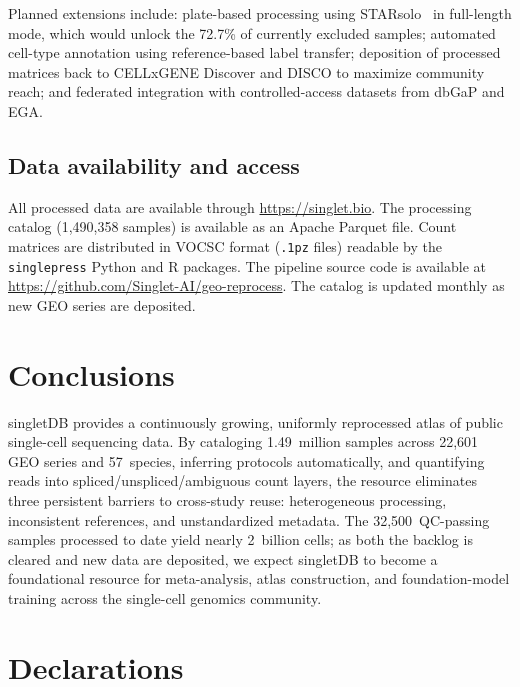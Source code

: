 \documentclass[10pt,twocolumn,letterpaper]{article}
\begin{document}
Planned extensions include: plate-based processing using
STARsolo~\citep{kaminow2021starsolo} in full-length mode, which would
unlock the 72.7\% of currently excluded samples; automated cell-type
annotation using reference-based label transfer; deposition of processed
matrices back to CELLxGENE Discover and DISCO to maximize community
reach; and federated integration with controlled-access datasets from
dbGaP and EGA.

\subsection{Data availability and access}

All processed data are available through \url{https://singlet.bio}.
The processing catalog (1,490,358 samples) is available as an Apache
Parquet file. Count matrices are distributed in VOCSC format
(\texttt{.1pz} files) readable by the \texttt{singlepress} Python
and R packages. The pipeline source code is available at
\url{https://github.com/Singlet-AI/geo-reprocess}. The catalog is
updated monthly as new GEO series are deposited.

\section{Conclusions}

singletDB provides a continuously growing, uniformly reprocessed atlas of
public single-cell sequencing data. By cataloging 1.49~million samples
across 22,601 GEO series and 57~species, inferring protocols
automatically, and quantifying reads into spliced/unspliced/ambiguous
count layers, the resource eliminates three persistent barriers to
cross-study reuse: heterogeneous processing, inconsistent references, and
unstandardized metadata. The 32,500~QC-passing samples processed to date
yield nearly 2~billion cells; as both the backlog is cleared and new data
are deposited, we expect singletDB to become a foundational resource for
meta-analysis, atlas construction, and foundation-model training across
the single-cell genomics community.

\section*{Declarations}
\end{document}
